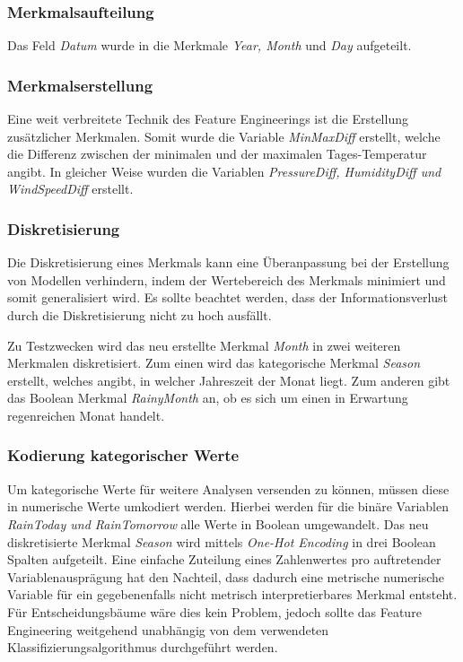 \subsubsection{Merkmalsaufteilung}
Das Feld \emph{Datum} wurde in die Merkmale \emph{Year, Month} und \emph{Day} aufgeteilt.

\subsubsection{Merkmalserstellung}
Eine weit verbreitete Technik des Feature Engineerings ist die Erstellung zusätzlicher Merkmalen. Somit wurde die Variable \emph{MinMaxDiff} erstellt, welche die Differenz zwischen der minimalen und der maximalen Tages-Temperatur angibt. In gleicher Weise wurden die Variablen \emph{PressureDiff, HumidityDiff und WindSpeedDiff} erstellt.

\subsubsection{Diskretisierung}
Die Diskretisierung eines Merkmals kann eine Überanpassung bei der Erstellung von Modellen verhindern, indem der Wertebereich des Merkmals minimiert und somit generalisiert wird. Es sollte beachtet werden, dass der Informationsverlust durch die Diskretisierung nicht zu hoch ausfällt.

\noindent \hspace*{7mm}
Zu Testzwecken wird das neu erstellte Merkmal \emph{Month} in zwei weiteren Merkmalen diskretisiert. Zum einen wird das kategorische Merkmal \emph{Season} erstellt, welches angibt,  in welcher Jahreszeit der Monat liegt. Zum anderen gibt das Boolean Merkmal \emph{RainyMonth} an, ob es sich um einen in Erwartung regenreichen Monat handelt.

\subsubsection{Kodierung kategorischer Werte}
Um kategorische Werte für weitere Analysen versenden zu können, müssen diese in numerische Werte umkodiert werden. Hierbei werden für die binäre Variablen \emph{RainToday und RainTomorrow} alle Werte in Boolean umgewandelt. Das neu diskretisierte Merkmal \emph{Season} wird mittels \emph{One-Hot Encoding} in drei Boolean Spalten aufgeteilt. Eine einfache Zuteilung eines Zahlenwertes pro auftretender Variablenausprägung hat den Nachteil, dass dadurch eine metrische numerische Variable für ein gegebenenfalls nicht metrisch interpretierbares Merkmal entsteht. Für Entscheidungsbäume wäre dies kein Problem, jedoch sollte das Feature Engineering weitgehend unabhängig von dem verwendeten Klassifizierungsalgorithmus durchgeführt werden.

